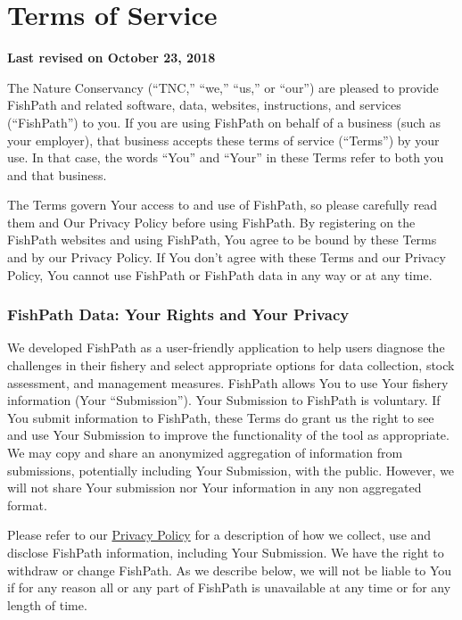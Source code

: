 \documentclass[11pt,]{book}
\begin{document}
\hypertarget{terms}{%
\chapter{Terms of Service}\label{terms}}

\textbf{Last revised on October 23, 2018}

The Nature Conservancy (``TNC,'' ``we,'' ``us,'' or ``our'') are pleased
to provide FishPath and related software, data, websites, instructions,
and services (``FishPath'') to you. If you are using FishPath on behalf
of a business (such as your employer), that business accepts these terms
of service (``Terms'') by your use. In that case, the words ``You'' and
``Your'' in these Terms refer to both you and that business.

The Terms govern Your access to and use of FishPath, so please carefully
read them and Our Privacy Policy before using FishPath. By registering
on the FishPath websites and using FishPath, You agree to be bound by
these Terms and by our Privacy Policy. If You don't agree with these
Terms and our Privacy Policy, You cannot use FishPath or FishPath data
in any way or at any time.

\hypertarget{fishpath-data-your-rights-and-your-privacy}{%
\subsection*{FishPath Data: Your Rights and Your
Privacy}\label{fishpath-data-your-rights-and-your-privacy}}

We developed FishPath as a user-friendly application to help users
diagnose the challenges in their fishery and select appropriate options
for data collection, stock assessment, and management measures. FishPath
allows You to use Your fishery information (Your ``Submission''). Your
Submission to FishPath is voluntary. If You submit information to
FishPath, these Terms do grant us the right to see and use Your
Submission to improve the functionality of the tool as appropriate. We
may copy and share an anonymized aggregation of information from
submissions, potentially including Your Submission, with the public.
However, we will not share Your submission nor Your information in any
non aggregated format.

Please refer to our
\href{https://www.nature.org/en-us/about-us/who-we-are/accountability/privacy-policy/}{Privacy
Policy} for a description of how we collect, use and disclose FishPath
information, including Your Submission. We have the right to withdraw or
change FishPath. As we describe below, we will not be liable to You if
for any reason all or any part of FishPath is unavailable at any time or
for any length of time.
\end{document}
